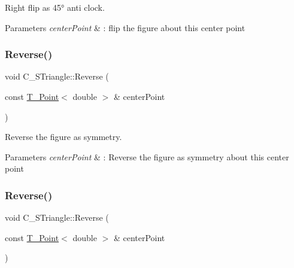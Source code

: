 Right flip as 45° anti clock. 


\begin{DoxyParams}{Parameters}
{\em center\+Point} & \+: flip the figure about this center point \\
\hline
\end{DoxyParams}
\mbox{\label{classC__STriangle_a3fafeed75d888024e95a494b8901e8fe}} 
\subsubsection{\texorpdfstring{Reverse()}{Reverse()}\hspace{0.1cm}{\footnotesize\ttfamily [1/2]}}
{\footnotesize\ttfamily void C\+\_\+\+S\+Triangle\+::\+Reverse (\begin{DoxyParamCaption}\item[{const \hyperlink{classT__Point}{T\+\_\+\+Point}$<$ double $>$ \&}]{center\+Point }\end{DoxyParamCaption})}



Reverse the figure as symmetry. 


\begin{DoxyParams}{Parameters}
{\em center\+Point} & \+: Reverse the figure as symmetry about this center point \\
\hline
\end{DoxyParams}
\mbox{\label{classC__STriangle_a3fafeed75d888024e95a494b8901e8fe}} 
\subsubsection{\texorpdfstring{Reverse()}{Reverse()}\hspace{0.1cm}{\footnotesize\ttfamily [2/2]}}
{\footnotesize\ttfamily void C\+\_\+\+S\+Triangle\+::\+Reverse (\begin{DoxyParamCaption}\item[{const \hyperlink{classT__Point}{T\+\_\+\+Point}$<$ double $>$ \&}]{center\+Point }\end{DoxyParamCaption})}



